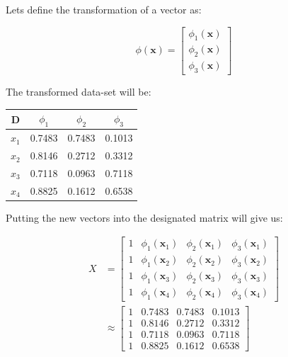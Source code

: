 \documentclass[12pt]{article}
\begin{document}
\begin{enumerate}[leftmargin=\labelsep]
\begin{enumerate}
        Lets define the transformation of a vector as:

        \begin{equation}
            \phi(\mathbf{x}) = \begin{bmatrix}
                \phi_1(\mathbf{x}) \\
                \phi_2(\mathbf{x}) \\
                \phi_3(\mathbf{x})
            \end{bmatrix}
        \end{equation}

        The transformed data-set will be:

        \begin{center}
            
            \begin{tabular}{|c|c|c|c|}
                \hline
                D & $\phi_1$ & $\phi_2$ & $\phi_3$ \\
                \hline
                $x_1$ & 0.7483 & 0.7483 & 0.1013 \\
                $x_2$ & 0.8146 & 0.2712 & 0.3312 \\
                $x_3$ & 0.7118 & 0.0963 & 0.7118 \\
                $x_4$ & 0.8825 & 0.1612 & 0.6538 \\
                \hline
            \end{tabular}
        \end{center}
            
        Putting the new vectors into the designated matrix will give us:

        \begin{equation}
        \begin{split}
            X &= \begin{bmatrix}
                1 & \phi_1(\mathbf{x}_1) & \phi_2(\mathbf{x}_1) & \phi_3(\mathbf{x}_1) \\
                1 & \phi_1(\mathbf{x}_2) & \phi_2(\mathbf{x}_2) & \phi_3(\mathbf{x}_2) \\
                1 & \phi_1(\mathbf{x}_3) & \phi_2(\mathbf{x}_3) & \phi_3(\mathbf{x}_3) \\
                1 & \phi_1(\mathbf{x}_4) & \phi_2(\mathbf{x}_4) & \phi_3(\mathbf{x}_4)
            \end{bmatrix} \\
            &\approx \begin{bmatrix}
                1 & 0.7483 & 0.7483 & 0.1013 \\
                1 & 0.8146 & 0.2712 & 0.3312 \\
                1 & 0.7118 & 0.0963 & 0.7118 \\
                1 & 0.8825 & 0.1612 & 0.6538
            \end{bmatrix}
        \end{split}
        \end{equation}


\end{enumerate}
\end{enumerate}
\end{document}

